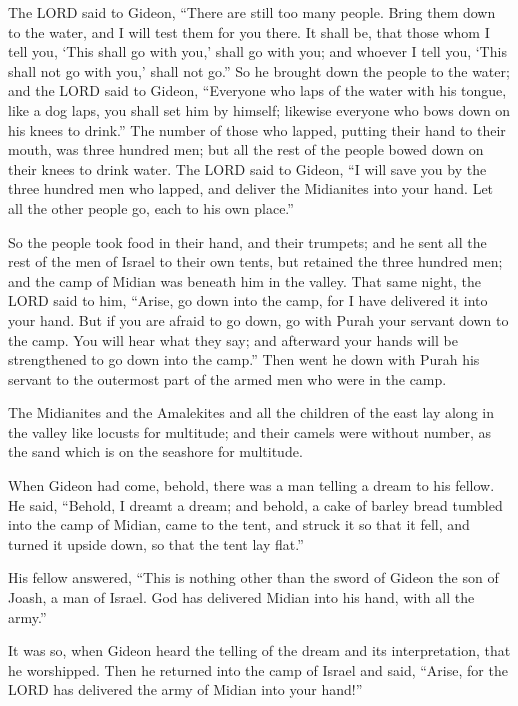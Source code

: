  The LORD said to Gideon, ``There are still too many
people. Bring them down to the water, and I will test them for you
there. It shall be, that those whom I tell you, `This shall go with
you,' shall go with you; and whoever I tell you, `This shall not go with
you,' shall not go.''  So he brought down the people to
the water; and the LORD said to Gideon, ``Everyone who laps of the water
with his tongue, like a dog laps, you shall set him by himself; likewise
everyone who bows down on his knees to drink.''  The
number of those who lapped, putting their hand to their mouth, was three
hundred men; but all the rest of the people bowed down on their knees to
drink water.  The LORD said to Gideon, ``I will save you
by the three hundred men who lapped, and deliver the Midianites into
your hand. Let all the other people go, each to his own place.''

 So the people took food in their hand, and their
trumpets; and he sent all the rest of the men of Israel to their own
tents, but retained the three hundred men; and the camp of Midian was
beneath him in the valley.  That same night, the LORD said
to him, ``Arise, go down into the camp, for I have delivered it into
your hand.  But if you are afraid to go down, go with
Purah your servant down to the camp.  You will hear what
they say; and afterward your hands will be strengthened to go down into
the camp.'' Then went he down with Purah his servant to the outermost
part of the armed men who were in the camp.

 The Midianites and the Amalekites and all the children
of the east lay along in the valley like locusts for multitude; and
their camels were without number, as the sand which is on the seashore
for multitude.

 When Gideon had come, behold, there was a man telling a
dream to his fellow. He said, ``Behold, I dreamt a dream; and behold, a
cake of barley bread tumbled into the camp of Midian, came to the tent,
and struck it so that it fell, and turned it upside down, so that the
tent lay flat.''

 His fellow answered, ``This is nothing other than the
sword of Gideon the son of Joash, a man of Israel. God has delivered
Midian into his hand, with all the army.''

 It was so, when Gideon heard the telling of the dream
and its interpretation, that he worshipped. Then he returned into the
camp of Israel and said, ``Arise, for the LORD has delivered the army of
Midian into your hand!''

